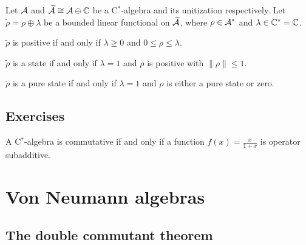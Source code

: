 \documentclass{../note}
\begin{document}
\begin{prb}
Let $\mathcal{A}$ and $\widetilde{\mathcal{A}}\cong\mathcal{A}\oplus\mathbb{C}$ be a C$^*$-algebra and its unitization respectively.
Let $\tilde\rho=\rho\oplus\lambda$ be a bounded linear functional on $\widetilde{\mathcal{A}}$, where $\rho\in\mathcal{A}^*$ and $\lambda\in\mathbb{C}^*=\mathbb{C}$.
\begin{parts}
\item $\tilde\rho$ is positive if and only if $\lambda\ge0$ and $0\le\rho\le\lambda$.
\item $\tilde\rho$ is a state if and only if $\lambda=1$ and $\rho$ is positive with $\|\rho\|\le1$.
\item $\tilde\rho$ is a pure state if and only if $\lambda=1$ and $\rho$ is either a pure state or zero.
\end{parts}
\end{prb}


\section*{Exercises}

\begin{prb}
A C$^*$-algebra is commutative if and only if a function $f(x)=\frac x{1+x}$ is operator subadditive.
\end{prb}





\chapter{Von Neumann algebras}
\section{The double commutant theorem}
\end{document}
